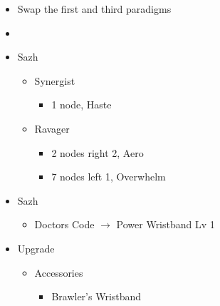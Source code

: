 \begin{multicols}{2}
\begin{menu}
\begin{itemize}
    \paradigm
    \begin{itemize}
        \item Swap the first and third paradigms
        \item {}%
{\paradigmline[1]{\textit{\syn}}{\textit{\sab}}{}}%
{\paradigmline{\com}{\med}{}}%
{\paradigmline{\com}{\rav}{}}%
{\paradigmline{\rav}{\rav}{}}%
{\paradigmline{[\rav]}{(\sab)}{}}%
{\paradigmline{[\com]}{(\sab)}{}}
    \end{itemize}
    \crystarium
    \begin{itemize}
        \item Sazh
        \begin{itemize}
            \item Synergist
            \begin{itemize}
                \item 1 node, Haste
            \end{itemize}
            \item Ravager
            \begin{itemize}
                \item 2 nodes right 2, Aero
                \item 7 nodes left 1, Overwhelm
            \end{itemize}
        \end{itemize}
    \end{itemize}
    \equip
    \begin{itemize}
        \item Sazh
        \begin{itemize}
                \item Doctors Code $\rightarrow$ Power Wristband Lv 1
        \end{itemize}
    \end{itemize}
\end{itemize}
\end{menu}
\vfill
\begin{upgrade}
\begin{itemize}
    \item Upgrade
    \begin{itemize}
        \item Accessories
        \begin{itemize}
            \item Brawler's Wristband
            \begin{itemize}

\end{itemize}
\end{itemize}
\end{itemize}
\end{itemize}
\end{upgrade}
\end{multicols}
